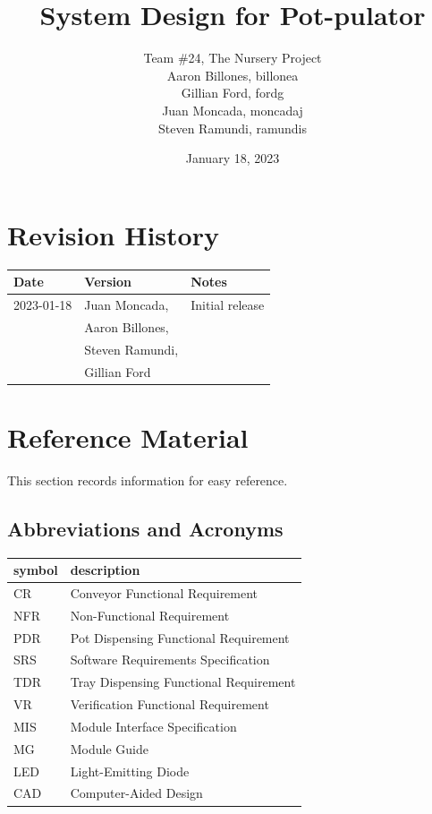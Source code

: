 \documentclass[12pt, titlepage]{article}
\begin{document}
\title{System Design for Pot-pulator} 
\author{Team \#24, The Nursery Project\\Aaron Billones, billonea\\Gillian Ford, fordg\\Juan Moncada, moncadaj\\Steven Ramundi, ramundis}
\date{January 18, 2023}

\maketitle


\section{Revision History}

\begin{tabularx}{\textwidth}{p{3cm}p{4cm}X}
  \toprule {\bf Date} & {\bf Version} & {\bf Notes}\\
  \midrule
  2023-01-18 & Juan Moncada,& Initial release\\&Aaron Billones,\\&Steven Ramundi,\\&Gillian Ford \\
  
  \bottomrule
  \end{tabularx}

\newpage

\section{Reference Material}

This section records information for easy reference.

\subsection{Abbreviations and Acronyms}

\renewcommand{\arraystretch}{1.2}
\begin{tabular}{l l} 
  \toprule		
  \textbf{symbol} & \textbf{description}\\
  \midrule 
  CR & Conveyor Functional Requirement\\
  NFR & Non-Functional Requirement\\
  PDR & Pot Dispensing Functional Requirement\\
  SRS & Software Requirements Specification\\
  TDR & Tray Dispensing Functional Requirement\\
  VR & Verification Functional Requirement\\
  MIS & Module Interface Specification \\
  MG & Module Guide \\
  LED & Light-Emitting Diode\\
  CAD & Computer-Aided Design\\
  \bottomrule
\end{tabular}\\
\end{document}
